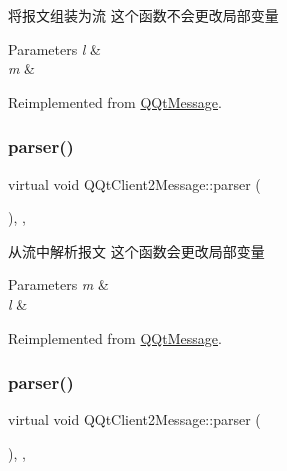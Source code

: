 将报文组装为流 这个函数不会更改局部变量 


\begin{DoxyParams}{Parameters}
{\em l} & \\
\hline
{\em m} & \\
\hline
\end{DoxyParams}


Reimplemented from \mbox{\hyperlink{class_q_qt_message_af1885c2c3628495808dca66ee8d72e14}{Q\+Qt\+Message}}.

\mbox{\label{class_q_qt_client2_message_a62ecd0dc6ff91e806dcbfbe48ca39ac8}} 
\subsubsection{\texorpdfstring{parser()}{parser()}\hspace{0.1cm}{\footnotesize\ttfamily [1/2]}}
{\footnotesize\ttfamily virtual void Q\+Qt\+Client2\+Message\+::parser (\begin{DoxyParamCaption}\item[{const Q\+Byte\+Array \&}]{ }\end{DoxyParamCaption})\hspace{0.3cm}{\ttfamily [inline]}, {\ttfamily [override]}, {\ttfamily [virtual]}}



从流中解析报文 这个函数会更改局部变量 


\begin{DoxyParams}{Parameters}
{\em m} & \\
\hline
{\em l} & \\
\hline
\end{DoxyParams}


Reimplemented from \mbox{\hyperlink{class_q_qt_message_a0bc25669bdd61490b1d8df6d77565f31}{Q\+Qt\+Message}}.

\mbox{\label{class_q_qt_client2_message_a62ecd0dc6ff91e806dcbfbe48ca39ac8}} 
\subsubsection{\texorpdfstring{parser()}{parser()}\hspace{0.1cm}{\footnotesize\ttfamily [2/2]}}
{\footnotesize\ttfamily virtual void Q\+Qt\+Client2\+Message\+::parser (\begin{DoxyParamCaption}\item[{const Q\+Byte\+Array \&}]{ }\end{DoxyParamCaption})\hspace{0.3cm}{\ttfamily [inline]}, {\ttfamily [override]}, {\ttfamily [virtual]}}



